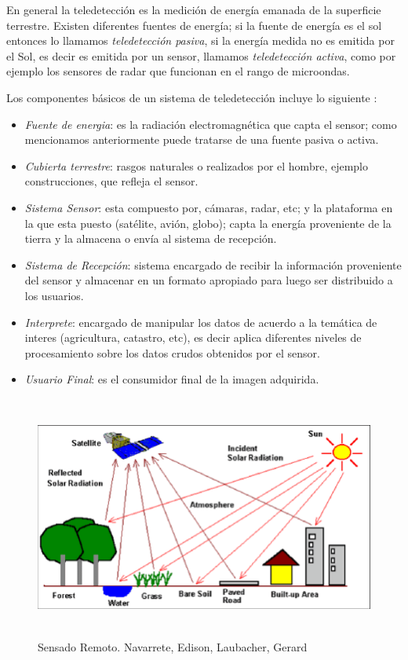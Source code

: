 En general la teledetección es la medición de energía emanada de la superficie terrestre. Existen diferentes fuentes de energía; si la fuente de energía es el sol entonces lo llamamos \textit{teledetección pasiva}, si la energía medida no es emitida por el Sol, es decir es emitida por un sensor, llamamos \textit{teledetección activa}, como por ejemplo los sensores de radar que funcionan en el rango de microondas.

Los componentes básicos de un sistema de teledetección incluye lo siguiente \citep{chuvieco}:
\begin{itemize}
\item \textit{Fuente de energia}: es la radiación electromagnética que capta el sensor; como mencionamos anteriormente puede tratarse de una fuente pasiva o activa.

\item \textit{Cubierta terrestre}: rasgos naturales o realizados por el hombre, ejemplo construcciones, que refleja el sensor.

\item \textit{Sistema Sensor}: esta compuesto por, cámaras, radar, etc; y la plataforma en la que esta puesto (satélite, avión, globo);  capta la energía proveniente de la tierra y la almacena o envía al sistema de recepción.

\item \textit{Sistema de Recepción}: sistema encargado de recibir la información proveniente del sensor y almacenar en un formato apropiado para luego ser distribuido a los usuarios.

\item \textit{Interprete}: encargado de manipular los datos de acuerdo a la temática de interes (agricultura, catastro, etc), es decir aplica diferentes niveles de procesamiento sobre los datos crudos obtenidos por el sensor.

\item \textit{Usuario Final}: es el consumidor final de la imagen adquirida.
\end{itemize}

\begin{figure}[H] \centering
  \includegraphics[height=8cm,keepaspectratio=true,clip=true]{imagenes/MarcoTeorico/teledeteccion.png}
  \caption{Sensado Remoto. Navarrete, Edison, Laubacher, Gerard}\label{Fig:teledeteccion}
\end{figure}


